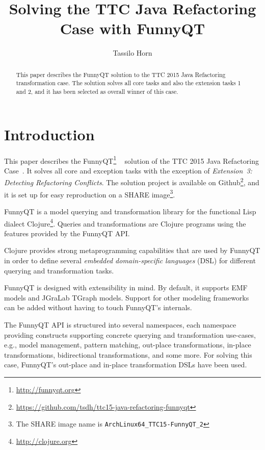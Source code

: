 \documentclass[submission]{eptcs}
\title{Solving the TTC Java Refactoring Case with FunnyQT}
\author{Tassilo Horn
  \institute{Institute for Software Technology, University Koblenz-Landau, Germany}
  \email{horn@uni-koblenz.de}}
\begin{document}
\maketitle

\begin{abstract}
  This paper describes the FunnyQT solution to the TTC 2015 Java Refactoring
  transformation case.  The solution solves all core tasks and also the
  extension tasks 1 and 2, and it has been selected as overall winner of this
  case.
\end{abstract}


\section{Introduction}
\label{sec:introduction}

This paper describes the FunnyQT\footnote{\url{http://funnyqt.org}}
~\cite{Horn2013MQWFQ,funnyqt-icgt15} solution of the TTC 2015 Java Refactoring
Case~\cite{java-refactoring-case-desc}.  It solves all core and exception tasks
with the exception of \emph{Extension~3: Detecting Refactoring Conflicts}.  The
solution project is available on
Github\footnote{\url{https://github.com/tsdh/ttc15-java-refactoring-funnyqt}},
and it is set up for easy reproduction on a SHARE image\footnote{The SHARE
  image name is \verb|ArchLinux64_TTC15-FunnyQT_2|}.

FunnyQT is a model querying and transformation library for the functional Lisp
dialect Clojure\footnote{\url{http://clojure.org}}.  Queries and
transformations are Clojure programs using the features provided by the FunnyQT
API.

Clojure provides strong metaprogramming capabilities that are used by FunnyQT
in order to define several \emph{embedded domain-specific languages} (DSL) for
different querying and transformation tasks.

FunnyQT is designed with extensibility in mind.  By default, it supports EMF
models and JGraLab TGraph models.  Support for other modeling frameworks can be
added without having to touch FunnyQT's internals.

The FunnyQT API is structured into several namespaces, each namespace providing
constructs supporting concrete querying and transformation use-cases, e.g.,
model management, pattern matching, out-place transformations, in-place
transformations, bidirectional transformations, and some more.  For solving
this case, FunnyQT's out-place and in-place transformation DSLs have been used.
\end{document}
